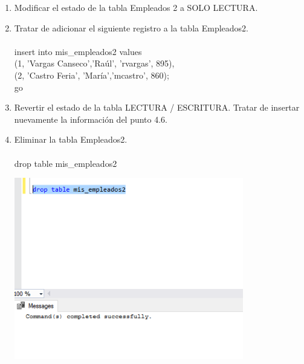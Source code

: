 \begin{enumerate}[1.]
\begin{center}
	\end{center}
	\item Modificar el estado de la tabla Empleados 2 a SOLO LECTURA.
	\item Tratar de adicionar el siguiente registro a la tabla Empleados2.
	\\
	\\insert into mis\_empleados2 values
	\\(1, 'Vargas Canseco','Ra\'ul', 'rvargas', 895),
	\\(2, 'Castro Feria',  'Mar\'ia','mcastro', 860);
	\\go
	\item Revertir el estado de la tabla LECTURA / ESCRITURA. Tratar de insertar nuevamente la información del punto 4.6.
	\item Eliminar la tabla Empleados2.
	\\
	\\drop table mis\_empleados2
	\begin{center}
	\includegraphics[width=10cm]{./Imagenes/prac2eje8} 
	\end{center}
	
\end{enumerate}
